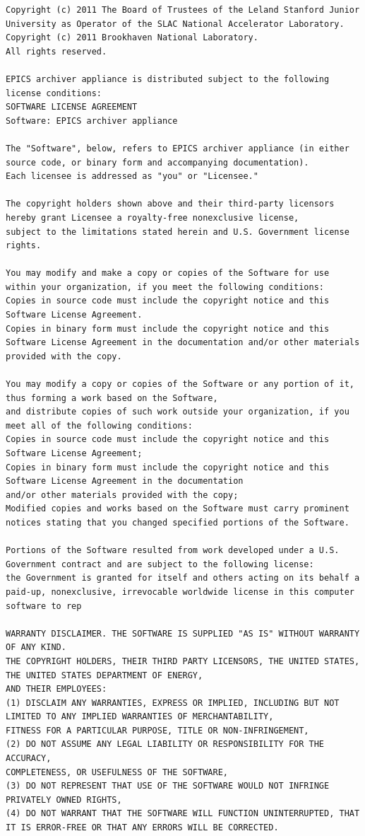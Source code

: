 \documentclass[11pt
  , a4paper
  , article
  , oneside
]{memoir}
\begin{document}
\begin{lstlisting}[style=termstyle]
Copyright (c) 2011 The Board of Trustees of the Leland Stanford Junior University as Operator of the SLAC National Accelerator Laboratory.
Copyright (c) 2011 Brookhaven National Laboratory.
All rights reserved.

EPICS archiver appliance is distributed subject to the following license conditions:
SOFTWARE LICENSE AGREEMENT
Software: EPICS archiver appliance

The "Software", below, refers to EPICS archiver appliance (in either source code, or binary form and accompanying documentation).
Each licensee is addressed as "you" or "Licensee."

The copyright holders shown above and their third-party licensors hereby grant Licensee a royalty-free nonexclusive license,
subject to the limitations stated herein and U.S. Government license rights.

You may modify and make a copy or copies of the Software for use within your organization, if you meet the following conditions:
Copies in source code must include the copyright notice and this Software License Agreement.
Copies in binary form must include the copyright notice and this Software License Agreement in the documentation and/or other materials
provided with the copy.

You may modify a copy or copies of the Software or any portion of it, thus forming a work based on the Software,
and distribute copies of such work outside your organization, if you meet all of the following conditions:
Copies in source code must include the copyright notice and this Software License Agreement;
Copies in binary form must include the copyright notice and this Software License Agreement in the documentation
and/or other materials provided with the copy;
Modified copies and works based on the Software must carry prominent notices stating that you changed specified portions of the Software.

Portions of the Software resulted from work developed under a U.S. Government contract and are subject to the following license:
the Government is granted for itself and others acting on its behalf a paid-up, nonexclusive, irrevocable worldwide license in this computer software to rep

WARRANTY DISCLAIMER. THE SOFTWARE IS SUPPLIED "AS IS" WITHOUT WARRANTY OF ANY KIND.
THE COPYRIGHT HOLDERS, THEIR THIRD PARTY LICENSORS, THE UNITED STATES, THE UNITED STATES DEPARTMENT OF ENERGY,
AND THEIR EMPLOYEES: 
(1) DISCLAIM ANY WARRANTIES, EXPRESS OR IMPLIED, INCLUDING BUT NOT LIMITED TO ANY IMPLIED WARRANTIES OF MERCHANTABILITY,
FITNESS FOR A PARTICULAR PURPOSE, TITLE OR NON-INFRINGEMENT,
(2) DO NOT ASSUME ANY LEGAL LIABILITY OR RESPONSIBILITY FOR THE ACCURACY,
COMPLETENESS, OR USEFULNESS OF THE SOFTWARE,
(3) DO NOT REPRESENT THAT USE OF THE SOFTWARE WOULD NOT INFRINGE PRIVATELY OWNED RIGHTS,
(4) DO NOT WARRANT THAT THE SOFTWARE WILL FUNCTION UNINTERRUPTED, THAT IT IS ERROR-FREE OR THAT ANY ERRORS WILL BE CORRECTED.


\end{lstlisting}
\end{document}
